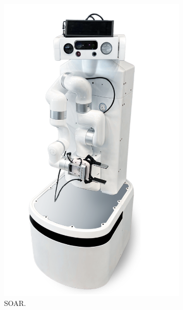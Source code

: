 \documentclass[runningheads,a4paper]{llncs}
\begin{document}
\begin{figure}[tbp]
	\centering
	\begin{subfigure}[b]{0.4\linewidth}
		\includegraphics[width=\linewidth]{images/soar.png}
		\caption{SOAR.}
		\label{fig:component_soar}
	\end{subfigure}
	\begin{minipage}[b]{0.25\linewidth}
		\centering
		\begin{subfigure}[b]{\linewidth}

\end{subfigure}
\end{minipage}
\end{figure}
\end{document}
